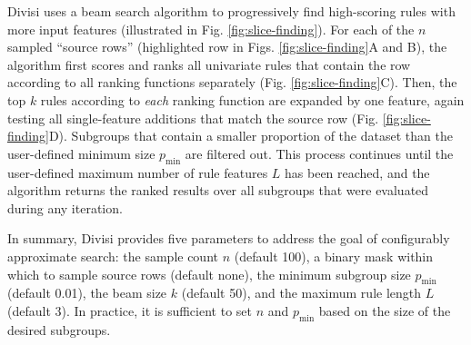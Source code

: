 Divisi uses a beam search algorithm to progressively find high-scoring rules with more input features (illustrated in Fig. \ref{fig:slice-finding}). For each of the $n$ sampled ``source rows'' (highlighted row in Figs. \ref{fig:slice-finding}A and B), the algorithm first scores and ranks all univariate rules that contain the row according to all ranking functions separately (Fig. \ref{fig:slice-finding}C). Then, the top $k$ rules according to \textit{each} ranking function are expanded by one feature, again testing all single-feature additions that match the source row (Fig. \ref{fig:slice-finding}D). Subgroups that contain a smaller proportion of the dataset than the user-defined minimum size $p_\text{min}$ are filtered out. This process continues until the user-defined maximum number of rule features $L$ has been reached, and the algorithm returns the ranked results over all subgroups that were evaluated during any iteration. 

In summary, Divisi provides five parameters to address the goal of configurably approximate search: the sample count $n$ (default 100), a binary mask within which to sample source rows (default none), the minimum subgroup size $p_\text{min}$ (default 0.01), the beam size $k$ (default 50), and the maximum rule length $L$ (default 3).
In practice, it is sufficient to set $n$ and $p_\text{min}$ based on the size of the desired subgroups.

